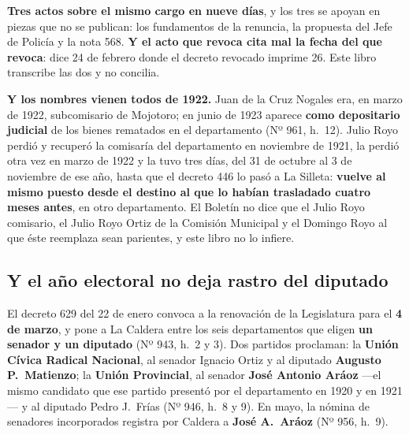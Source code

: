 \begin{cautela}
\textbf{Tres actos sobre el mismo cargo en nueve días}, y los tres se apoyan en piezas que no se
publican: los fundamentos de la renuncia, la propuesta del Jefe de Policía y la nota 568.
\textbf{Y el acto que revoca cita mal la fecha del que revoca}: dice 24 de febrero donde el
decreto revocado imprime 26. Este libro transcribe las dos y no concilia.

\textbf{Y los nombres vienen todos de 1922.} Juan de la Cruz Nogales era, en marzo de 1922,
subcomisario de Mojotoro; en junio de 1923 aparece \textbf{como depositario judicial} de los
bienes rematados en el departamento (Nº 961, h.\ 12). Julio Royo perdió y recuperó la comisaría del
departamento en noviembre de 1921, la perdió otra vez en marzo de 1922 y la tuvo tres días, del
31 de octubre al 3 de noviembre de ese año, hasta que el decreto 446 lo pasó a La Silleta:
\textbf{vuelve al mismo puesto desde el destino al que lo habían trasladado cuatro meses antes},
en otro departamento. El
Boletín no dice que el Julio Royo comisario, el Julio Royo Ortiz de la Comisión Municipal y el
Domingo Royo al que éste reemplaza sean parientes, y este libro no lo infiere.
\end{cautela}

\subsection*{Y el año electoral no deja rastro del diputado}

El decreto 629 del 22 de enero convoca a la renovación de la Legislatura para el \textbf{4 de
marzo}, y pone a La Caldera entre los seis departamentos que eligen \textbf{un senador y un
diputado} (Nº 943, h.\ 2 y 3). Dos partidos proclaman: la \textbf{Unión Cívica Radical Nacional},
al senador Ignacio Ortiz y al diputado \textbf{Augusto P.\ Matienzo}; la \textbf{Unión
Provincial}, al senador \textbf{José Antonio Aráoz} ---el mismo candidato que ese partido
presentó por el departamento en 1920 y en 1921--- y al diputado Pedro J.\ Frías (Nº 946,
h.\ 8 y 9). En mayo, la nómina de senadores incorporados registra por Caldera a \textbf{José
A.\ Aráoz} (Nº 956, h.\ 9).

